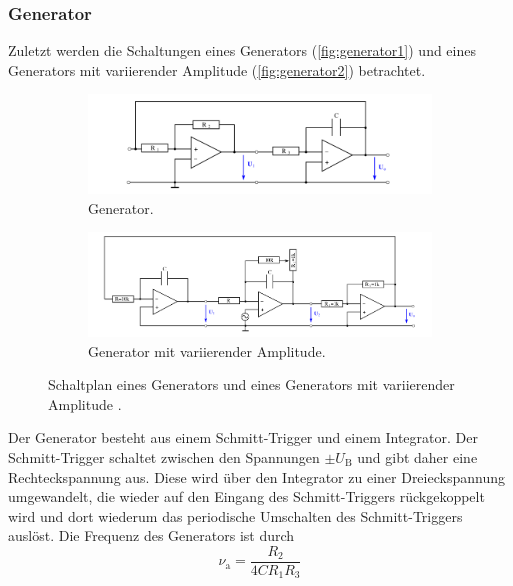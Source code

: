 \subsubsection{Generator}
Zuletzt werden die Schaltungen eines Generators (\autoref{fig:generator1}) und eines Generators mit variierender Amplitude (\autoref{fig:generator2}) betrachtet.
\begin{figure}
    \centering
    \begin{subfigure}{\textwidth}
        \includegraphics[width=\textwidth]{"content/pics/generator1.png"}
        \caption{Generator.}
        \label{fig:generator1}
    \end{subfigure}
    \vfill
    \begin{subfigure}{0.9\textwidth}
        \includegraphics[width=\textwidth]{"content/pics/generator2.png"}
        \caption{Generator mit variierender Amplitude.}
        \label{fig:generator2}
    \end{subfigure}
    \caption{Schaltplan eines Generators und eines Generators mit variierender Amplitude \cite{v51}.}
    \label{fig:generator}
\end{figure}
Der Generator besteht aus einem Schmitt-Trigger und einem Integrator. Der Schmitt-Trigger schaltet zwischen den Spannungen $\pm U_\text{B}$ und gibt daher eine Rechteckspannung aus.
Diese wird über den Integrator zu einer Dreieckspannung umgewandelt, die wieder auf den Eingang des Schmitt-Triggers rückgekoppelt wird und dort wiederum das periodische 
Umschalten des Schmitt-Triggers auslöst. 
Die Frequenz des Generators ist durch
\begin{equation}
\nu_\text{a} = \frac{R_2}{4C R_1 R_3}
\label{eq:freq_generator}
\end{equation}
